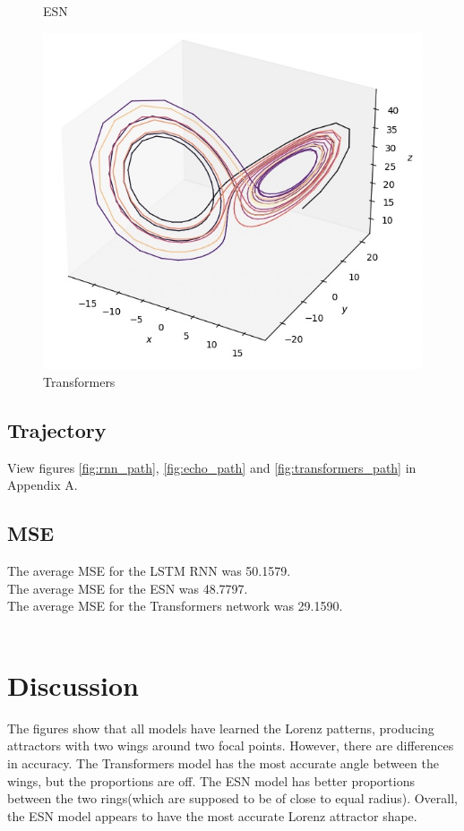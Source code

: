 \documentclass[11pt]{article}
\begin{document}
\begin{figure}[ht]
\begin{minipage}{0.32\textwidth}
        \caption{ESN}
        \label{fig:echo_lorenz}
    \end{minipage}
    \hfill
    \begin{minipage}{0.32\textwidth}
        \centering
        \includegraphics[width=\textwidth]{transformers_lorenz.jpeg}
        \caption{Transformers}
        \label{fig:transformers_lorenz}
    \end{minipage}
\end{figure}

\subsection{Trajectory}
View figures \ref{fig:rnn_path}, \ref{fig:echo_path} and \ref{fig:transformers_path} in Appendix A.
\subsection{MSE}
The average MSE for the LSTM RNN was 50.1579. \\
The average MSE for the ESN was 48.7797. \\
The average MSE for the Transformers network was 29.1590. \\ \\

\section{Discussion}
The figures show that all models have learned the Lorenz patterns, producing attractors with two wings around two focal points. However, there are differences in accuracy. The Transformers model has the most accurate angle between the wings, but the proportions are off. The ESN model has better proportions between the two rings(which are supposed to be of close to equal radius). Overall, the ESN model appears to have the most accurate Lorenz attractor shape.
\end{document}
